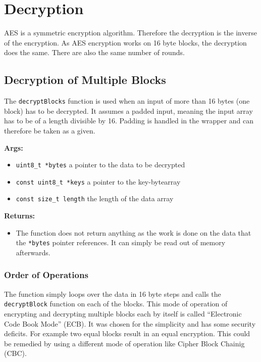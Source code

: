 \section{Decryption}
\label{ch:decryption}

AES is a symmetric encryption algorithm. Therefore the decryption is the inverse of the encryption. As AES encryption works on 16 byte blocks, the decryption does the same. There are also the same number of rounds.

\subsection{Decryption of Multiple Blocks}
\label{ch:dec_multipleblocks}
The \lstinline|decryptBlocks| function is used when an input of more than 16 bytes (one block) has to be decrypted. It assumes a padded input, meaning the input array has to be of a length divisible by 16. Padding is handled in the wrapper and can therefore be taken as a given.

\textbf{Args:}
\begin{itemize}
  \item \lstinline{uint8_t *bytes} a pointer to the data to be decrypted
  \item \lstinline{const uint8_t *keys} a pointer to the key-bytearray
  \item \lstinline{const size_t length} the length of the data array
\end{itemize}

\textbf{Returns:}
\begin{itemize}
  \item The function does not return anything as the work is done on the data that the \lstinline{*bytes} pointer references. It can simply be read out of memory afterwards.
\end{itemize}

\subsubsection{Order of Operations}
The function simply loops over the data in 16 byte steps and calls the \lstinline{decryptBlock} function on each of the blocks. This mode of operation of encrypting and decrypting multiple blocks each by itself is called \enquote{Electronic Code Book Mode} (ECB). It was chosen for the simplicity and has some security deficits. For example two equal blocks result in an equal encryption. This could be remedied by using a different mode of operation like Cipher Block Chainig (CBC).

